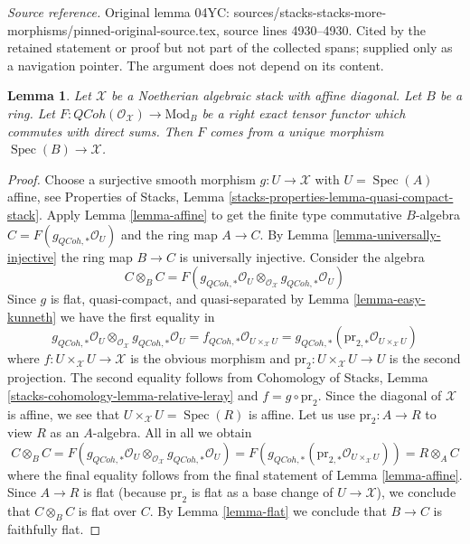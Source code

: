 \documentclass[10pt,a4paper]{amsart}
\theoremstyle{plain}
\newtheorem{lemma}[subsection]{Lemma}
\theoremstyle{definition}
\theoremstyle{remark}
\numberwithin{equation}{subsection}
\def\Spec{\mathop{\mathrm{Spec}}}
\def\QCoh{\mathit{QCoh}}
\begin{document}
\noindent\textit{Source reference.} Original lemma 04YC: sources/stacks-stacks-more-morphisms/pinned-original-source.tex, source lines 4930--4930. Cited by the retained statement or proof but not part of the collected spans; supplied only as a navigation pointer. The argument does not depend on its content.\par\medskip
\begin{lemma}
\label{lemma-main}
Let $\mathcal{X}$ be a Noetherian algebraic stack with affine diagonal.
Let $B$ be a ring.
Let $F : \QCoh(\mathcal{O}_\mathcal{X}) \to \text{Mod}_B$
be a right exact tensor functor which commutes with direct sums.
Then $F$ comes from a unique morphism $\Spec(B) \to \mathcal{X}$.
\end{lemma}

\begin{proof}
Choose a surjective smooth morphism $g : U \to \mathcal{X}$ with $U = \Spec(A)$
affine, see Properties of Stacks, Lemma
\ref{stacks-properties-lemma-quasi-compact-stack}. Apply
Lemma \ref{lemma-affine} to get the finite type
commutative $B$-algebra $C = F(g_{\QCoh, *}\mathcal{O}_U)$
and the ring map $A \to C$.
By Lemma \ref{lemma-universally-injective}
the ring map $B \to C$ is universally injective.
Consider the algebra
$$
C \otimes_B C =
F(g_{\QCoh, *}\mathcal{O}_U
\otimes_{\mathcal{O}_\mathcal{X}}
g_{\QCoh, *}\mathcal{O}_U)
$$
Since $g$ is flat, quasi-compact, and quasi-separated
by Lemma \ref{lemma-easy-kunneth} we have the first equality in
$$
g_{\QCoh, *}\mathcal{O}_U
\otimes_{\mathcal{O}_\mathcal{X}}
g_{\QCoh, *}\mathcal{O}_U
=
f_{\QCoh, *}\mathcal{O}_{U \times_\mathcal{X} U} =
g_{\QCoh, *}(\text{pr}_{2, *}\mathcal{O}_{U \times_\mathcal{X} U})
$$
where
$f : U \times_\mathcal{X} U \to \mathcal{X}$ is the obvious morphism
and $\text{pr}_2 : U \times_\mathcal{X} U \to U$ is the second
projection. The second equality follows from
Cohomology of Stacks, Lemma \ref{stacks-cohomology-lemma-relative-leray}
and $f = g \circ \text{pr}_2$. Since the diagonal of $\mathcal{X}$
is affine, we see that $U \times_\mathcal{X} U = \Spec(R)$ is affine.
Let us use $\text{pr}_2 : A \to R$ to view $R$ as an $A$-algebra.
All in all we obtain
$$
C \otimes_B C =
F(g_{\QCoh, *}\mathcal{O}_U
\otimes_{\mathcal{O}_\mathcal{X}}
g_{\QCoh, *}\mathcal{O}_U) =
F(g_{\QCoh, *}(\text{pr}_{2, *}\mathcal{O}_{U \times_\mathcal{X} U})) =
R \otimes_A C
$$
where the final equality follows from the final statement of
Lemma \ref{lemma-affine}. Since $A \to R$ is flat (because
$\text{pr}_2$ is flat as a base change of $U \to \mathcal{X}$),
we conclude that $C \otimes_B C$ is flat over $C$.
By Lemma \ref{lemma-flat} we conclude that $B \to C$ is faithfully flat.


\end{proof}
\end{document}
